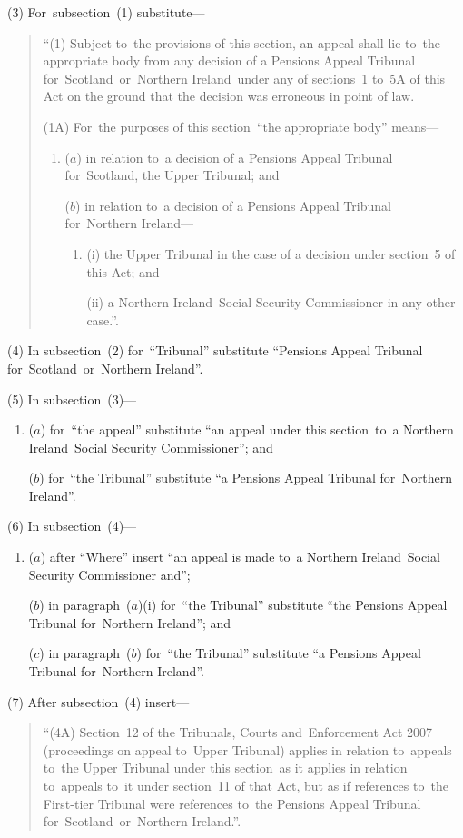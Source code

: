 \documentclass[12pt,a4paper]{article}
\begin{document}
(3) For~subsection~(1) substitute—
\begin{quotation}
“(1) Subject to~the provisions of this section, an appeal shall lie to~the appropriate body from any decision of a Pensions Appeal Tribunal for~Scotland~or~Northern Ireland~under any of sections~1 to~5A of this Act on the ground that the decision was erroneous in point of law.

(1A) For~the purposes of this section~“the appropriate body” means—
\begin{enumerate}\item[]
($a$) in relation to~a decision of a Pensions Appeal Tribunal for~Scotland, the Upper Tribunal; and

($b$) in relation to~a decision of a Pensions Appeal Tribunal for~Northern Ireland—
\begin{enumerate}\item[]
(i) the Upper Tribunal in the case of a decision under section~5 of this Act; and

(ii) a Northern Ireland~Social Security Commissioner in any other case.”.
\end{enumerate}
\end{enumerate}
\end{quotation}

(4) In subsection~(2) for~“Tribunal” substitute “Pensions Appeal Tribunal for~Scotland~or~Northern Ireland”.

(5) In subsection~(3)—
\begin{enumerate}\item[]
($a$) for~“the appeal” substitute “an appeal under this section~to~a Northern Ireland~Social Security Commissioner”; and

($b$) for~“the Tribunal” substitute “a Pensions Appeal Tribunal for~Northern Ireland”.
\end{enumerate}

(6) In subsection~(4)—
\begin{enumerate}\item[]
($a$) after “Where” insert “an appeal is made to~a Northern Ireland~Social Security Commissioner and”;

($b$) in paragraph~($a$)(i)  for~“the Tribunal” substitute “the Pensions Appeal Tribunal for~Northern Ireland”; and

($c$) in paragraph~($b$)  for~“the Tribunal” substitute “a Pensions Appeal Tribunal for~Northern Ireland”.
\end{enumerate}

(7) After subsection~(4) insert—
\begin{quotation}
“(4A) Section~12 of the Tribunals, Courts and~Enforcement Act 2007 (proceedings on appeal to~Upper Tribunal) applies in relation to~appeals to~the Upper Tribunal under this section~as it applies in relation to~appeals to~it under section~11 of that Act, but as if references to~the First-tier Tribunal were references to~the Pensions Appeal Tribunal for~Scotland~or~Northern Ireland.”.
\end{quotation}
\end{document}
